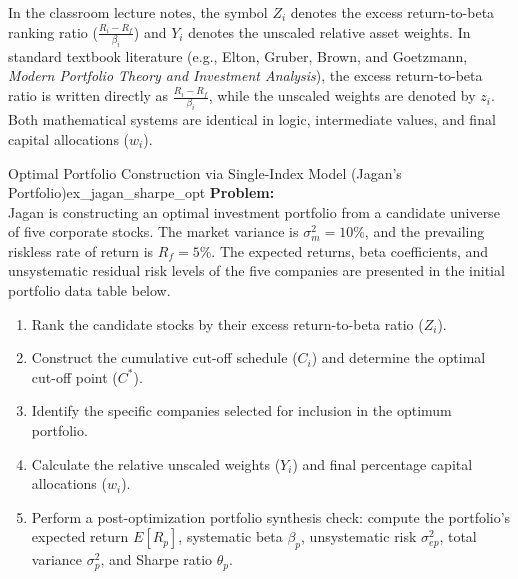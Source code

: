 \begin{tcolorbox}[colback=lightgray!15, colframe=navyblue!60, title=\textbf{Pedagogical Note on Notation Conventions}]
\small
In the classroom lecture notes, the symbol $Z_i$ denotes the excess return-to-beta ranking ratio ($\frac{R_i - R_f}{\beta_i}$) and $Y_i$ denotes the unscaled relative asset weights. In standard textbook literature (e.g., Elton, Gruber, Brown, and Goetzmann, \textit{Modern Portfolio Theory and Investment Analysis}), the excess return-to-beta ratio is written directly as $\frac{R_i - R_f}{\beta_i}$, while the unscaled weights are denoted by $z_i$. Both mathematical systems are identical in logic, intermediate values, and final capital allocations ($w_i$).
\end{tcolorbox}

\begin{example}{Optimal Portfolio Construction via Single-Index Model (Jagan's Portfolio)}{ex_jagan_sharpe_opt}
\textbf{Problem:}\\[0.2em]
Jagan is constructing an optimal investment portfolio from a candidate universe of five corporate stocks. The market variance is $\sigma_m^2 = 10\%$, and the prevailing riskless rate of return is $R_f = 5\%$. The expected returns, beta coefficients, and unsystematic residual risk levels of the five companies are presented in the initial portfolio data table below.
\begin{enumerate}[leftmargin=*, noitemsep]
    \item Rank the candidate stocks by their excess return-to-beta ratio ($Z_i$).
    \item Construct the cumulative cut-off schedule ($C_i$) and determine the optimal cut-off point ($C^*$).
    \item Identify the specific companies selected for inclusion in the optimum portfolio.
    \item Calculate the relative unscaled weights ($Y_i$) and final percentage capital allocations ($w_i$).
    \item Perform a post-optimization portfolio synthesis check: compute the portfolio's expected return $E[R_p]$, systematic beta $\beta_p$, unsystematic risk $\sigma_{ep}^2$, total variance $\sigma_p^2$, and Sharpe ratio $\theta_p$.
\end{enumerate}


\end{example}

